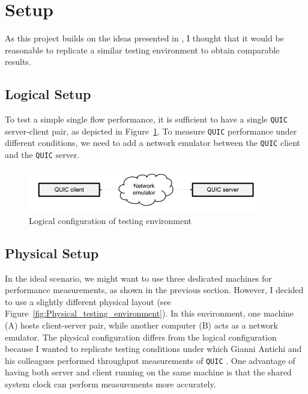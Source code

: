 \documentclass[12pt,a4paper,twoside,openright]{report}
\begin{document}




\section{Setup}

As this project builds on the ideas presented in \cite{Making_QUIC_Quicker}, I thought that it would be reasonable to replicate a similar testing environment to obtain comparable results.

\subsection{Logical Setup}
To test a simple single flow performance, it is sufficient to have a single \texttt{QUIC} server-client pair, as depicted in Figure~\ref{fig:Logical_testing_environment}.
To measure \texttt{QUIC} performance under different conditions, we need to add a network emulator between the \texttt{QUIC} client and the \texttt{QUIC} server.

    \begin{figure}[ht]
    \centering
    \includegraphics[width=0.9\textwidth]{figs/Logical_testing_environment.png}
    \caption{Logical configuration of testing environment}
    \label{fig:Logical_testing_environment}
    \end{figure}

\subsection{Physical Setup} \label{physical_setup_subsection}
    In the ideal scenario, we might want to use three dedicated machines for performance measurements, as shown in the previous section.
    However, I decided to use a slightly different physical layout (see Figure~\ref{fig:Physical_testing_environment}).
    In this environment, one machine (A) hosts client-server pair, while another computer (B) acts as a network emulator.
    The physical configuration differs from the logical configuration because I wanted to replicate testing conditions under which Gianni Antichi and his colleagues performed throughput measurements of \texttt{QUIC} \cite{Making_QUIC_Quicker}.
    One advantage of having both server and client running on the same machine is that the shared system clock can perform measurements more accurately. 
    
\end{document}

